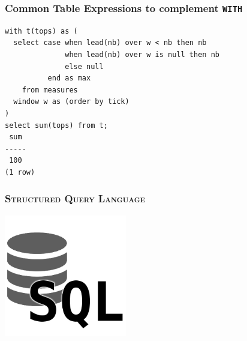 \documentclass{beamer}
\begin{document}
\begin{frame}[fragile]
  \frametitle{Common Table Expressions to complement \texttt{WITH}}

\begin{verbatim}
with t(tops) as (
  select case when lead(nb) over w < nb then nb
              when lead(nb) over w is null then nb
              else null
          end as max
    from measures
  window w as (order by tick)
)
select sum(tops) from t;
 sum 
-----
 100
(1 row)
\end{verbatim}
\end{frame}


\begin{frame}
  \frametitle{\textsc{Structured Query Language}}

  \begin{center}
    \includegraphics[height=2.1in]{sql.png}
  \end{center}
\end{frame}
\end{document}
